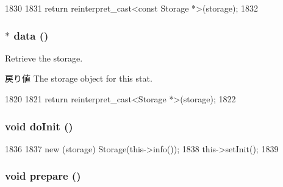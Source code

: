 \begin{DoxyCode}
1830     {
1831         return reinterpret_cast<const Storage *>(storage);
1832     }
\end{DoxyCode}
\hypertarget{classStats_1_1DistBase_a6616795ceb2f25c33a3c2d6c0a387514}{
\subsubsection[{data}]{$\ast$ data ()}}
\label{classStats_1_1DistBase_a6616795ceb2f25c33a3c2d6c0a387514}
Retrieve the storage. \begin{DoxyReturn}{戻り値}
The storage object for this stat. 
\end{DoxyReturn}



\begin{DoxyCode}
1820     {
1821         return reinterpret_cast<Storage *>(storage);
1822     }
\end{DoxyCode}
\hypertarget{classStats_1_1DistBase_acbb3b2ff6c84b7ae0dcc576f85bee3b5}{
\subsubsection[{doInit}]{\setlength{\rightskip}{0pt plus 5cm}void doInit ()}}
\label{classStats_1_1DistBase_acbb3b2ff6c84b7ae0dcc576f85bee3b5}



\begin{DoxyCode}
1836     {
1837         new (storage) Storage(this->info());
1838         this->setInit();
1839     }
\end{DoxyCode}
\hypertarget{classStats_1_1DistBase_a1825b40ca3bc3a1ba67fdb58fac5015c}{
\subsubsection[{prepare}]{\setlength{\rightskip}{0pt plus 5cm}void prepare ()}}
\label{classStats_1_1DistBase_a1825b40ca3bc3a1ba67fdb58fac5015c}



